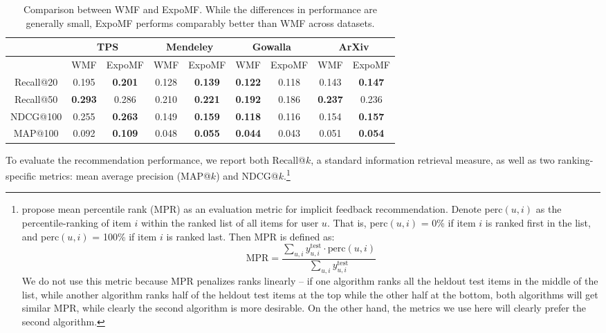 \documentclass{sig-alternate-arxiv}
\begin{document}
\begin{table*}
\centering
\begin{tabular}{ c | c c | c c | c c | c c  }
   & \multicolumn{2}{c}{\textbf{TPS}} & \multicolumn{2}{c}{\textbf{Mendeley}} & \multicolumn{2}{c}{\textbf{Gowalla}} & \multicolumn{2}{c}{\textbf{ArXiv}} \\ \hline
    & WMF & ExpoMF	& WMF & ExpoMF 	& WMF& ExpoMF &	 WMF & ExpoMF \\ \hline
  Recall@20 &  0.195 &  \textbf{0.201}              & 0.128 &  \textbf{0.139}                & \textbf{0.122} & 0.118                          &  0.143 & \textbf{0.147} \\
  Recall@50 &  \textbf{0.293} &  0.286              & 0.210 & \textbf{0.221}                  & \textbf{0.192} & 0.186                         & \textbf{0.237} & 0.236 \\
  NDCG@100  &  0.255 &  \textbf{0.263}              & 0.149 & \textbf{0.159}                 & \textbf{0.118} & 0.116                         & 0.154 & \textbf{0.157} \\
  MAP@100   &  0.092 &  \textbf{0.109}             & 0.048 & \textbf{0.055}                  & \textbf{0.044} & 0.043                         & 0.051 & \textbf{0.054}\\
\end{tabular}
\caption{Comparison between WMF \cite{hu2008collaborative} and ExpoMF. While
the differences in performance are generally small, ExpoMF performs comparably better than WMF across datasets.}
\label{tab:cfresults}
\end{table*}

To evaluate the recommendation performance, we report both Recall@$k$, a standard
information retrieval measure, as well as two ranking-specific
metrics: mean average precision (MAP@$k$) and
NDCG@$k$.\footnote{\citet{hu2008collaborative} propose mean percentile
rank (MPR) as an evaluation metric for implicit feedback recommendation. Denote perc$(u, i)$ as the percentile-ranking of item $i$ within the ranked list of all items for user $u$. That is, perc$(u, i)$ = 0\% if item $i$ is ranked first in the list, and perc$(u, i)$ = 100\% if item $i$ is ranked last. Then MPR is defined as:
\begin{displaymath}
\text{MPR} = \frac{\sum_{u, i} y^{\text{test}}_{u, i} \cdot \text{perc}(u, i)}{\sum_{u, i} y^{\text{test}}_{u, i}}
\end{displaymath}
We do not use this metric because MPR penalizes ranks linearly -- if one algorithm ranks all the heldout test items in the middle of the list, while another algorithm ranks half of the heldout test items at the top while the other half at the bottom, both algorithms will get similar MPR, while clearly the second algorithm is more desirable. On the other hand, the metrics we use here will clearly prefer the second algorithm.}
\end{document}
